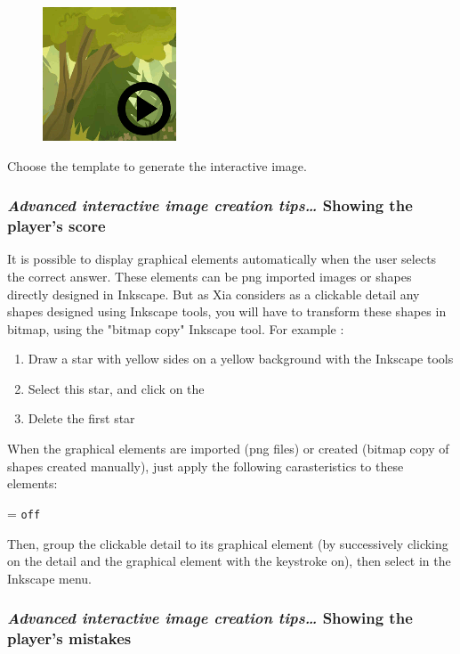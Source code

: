 \begin{figure}
  \centering
  \includegraphics[scale=0.7]{./images/game1clic} 
\end{figure}

Choose the template  to generate the interactive image.


\subsubsection{\emph{Advanced interactive image creation tips\ldots} Showing the player's score}

It is possible to display graphical elements automatically  when the user 
selects the correct answer. These elements can be png imported images or shapes directly designed in
Inkscape.
But as Xia considers as a clickable 
detail any shapes designed using Inkscape tools, you 
will have to transform these shapes in bitmap, using the "bitmap copy" Inkscape tool. 
For example :
\begin{enumerate}
 \item Draw  a star with yellow sides on a yellow background with the Inkscape tools 
 \item Select this star, and click on the 
 \item Delete the first star
\end{enumerate}

When the graphical elements are imported (png files) or created (bitmap copy 
of shapes created manually), just apply the following 
carasteristics to these elements:
\begin{center}
 = \verb|off|
\end{center}
Then, group the clickable detail to its graphical element (by successively 
clicking on the detail and the graphical element with the \Shift keystroke on),
then select  in the Inkscape  menu.

\subsubsection{\emph{Advanced interactive image creation tips\ldots} Showing the player's mistakes}

